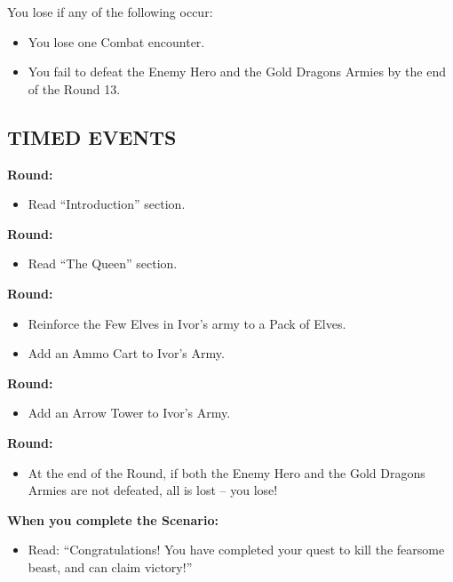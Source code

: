 \begin{multicols*}{2}
You lose if any of the following occur:
\begin{itemize}
  \item You lose one Combat encounter.
  \item You fail to defeat the Enemy Hero and the Gold Dragons Armies by the end of the Round 13.
\end{itemize}


\vspace*{\fill}
\columnbreak

\subsection*{\MakeUppercase{Timed Events}}

\textbf{ Round:}
\begin{itemize}
  \item Read ``Introduction'' section.
\end{itemize}

\textbf{ Round:}
\begin{itemize}
  \item Read ``The Queen'' section.
\end{itemize}

\textbf{ Round:}
\begin{itemize}
  \item Reinforce the Few Elves in Ivor's army to a Pack of Elves.
  \item Add an Ammo Cart to Ivor's Army.
\end{itemize}

\textbf{ Round:}
\begin{itemize}
  \item Add an Arrow Tower to Ivor's Army.
\end{itemize}

\textbf{ Round:}
\begin{itemize}
  \item At the end of the Round, if both the Enemy Hero and the Gold Dragons Armies are not defeated, all is lost -- you lose!
\end{itemize}

\textbf{When you complete the Scenario:}
\begin{itemize}
  \item Read: ``Congratulations! You have completed your quest to kill the fearsome beast, and can claim victory!''
\end{itemize}



\end{multicols*}
